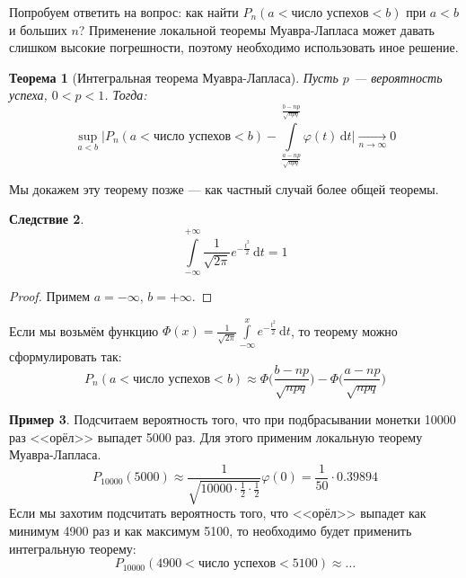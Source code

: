 \documentclass[11pt,openany,a4paper]{scrartcl}
\theoremstyle{plain}
\newtheorem{theorem}{Теорема}[subsection]
\newtheorem{corollary}[theorem]{Следствие}
\theoremstyle{definition}
\newtheorem{example}[theorem]{Пример}
\newcommand{\underto}[1]{\xrightarrow[#1]{}}
\newcommand{\dif}{\, \mathrm d}
\begin{document}
Попробуем ответить на вопрос: как найти $P_n(a < \text{число успехов} < b)$
при $a<b$ и больших $n$? Применение локальной теоремы Муавра-Лапласа может давать
слишком высокие погрешности, поэтому необходимо использовать иное решение.
\begin{theorem}[Интегральная теорема Муавра-Лапласа]\label{integral_theorem}
    Пусть $p$ — вероятность успеха, $0 < p < 1$. Тогда:
    $$
    \sup_{a<b} \Bigg| P_n(a < \text{число успехов} < b) -
    \int\limits_{\frac{a - np}{\sqrt{npq}}}^{\frac{b-np}{\sqrt{npq}}}
    \varphi(t) \dif t \Bigg| \underto{n \to \infty} 0
    $$
\end{theorem}

Мы докажем эту теорему позже — как частный случай более общей теоремы.

\begin{corollary}
    $$
    \int\limits_{-\infty}^{+\infty}
    \frac{1}{\sqrt{2\pi}}e^{-\frac{t^2}{2}}\dif t = 1
    $$
\end{corollary}
\begin{proof}
    Примем $a = -\infty$, $b = +\infty$.
\end{proof}

Если мы возьмём функцию $\Phi(x) = \frac{1}{\sqrt{2\pi}}\int\limits_{-\infty}^x
e^{-\frac{t^2}{2}}\dif t$,
то теорему можно сформулировать так:
$$
P_n(a < \text{число успехов} < b) \approx
\Phi\bigg(\frac{b-np}{\sqrt{npq}}\bigg) -
\Phi\bigg(\frac{a - np}{\sqrt{npq}}\bigg)
$$

\begin{example}
    Подсчитаем вероятность того, что при подбрасывании монетки 10000 раз <<орёл>>
    выпадет 5000 раз. Для этого применим локальную теорему Муавра-Лапласа.
    $$
    P_{10000}(5000) \approx
    \frac{1}{\sqrt{10000 \cdot \frac{1}{2} \cdot \frac{1}{2}}}\varphi(0) =
    \frac{1}{50} \cdot 0.39894
    $$
    Если мы захотим подсчитать вероятность того, что <<орёл>> выпадет как минимум 
    4900 раз и как максимум 5100, то необходимо будет применить интегральную
    теорему:
    $$
    P_{10000}(4900 < \text{число успехов} < 5100) \approx \ldots
    $$
\end{example}
\end{document}
